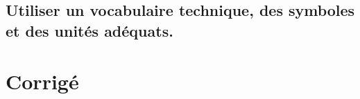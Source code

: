 \documentclass[10pt,fleqn]{article}
\newcommand{\repRel}{../..}
\newcommand{\repStyle}{\repRel/Style}
\newcommand{\td}{fichier_td}
\newcommand{\repExos}{\repRel/ExercicesCompetences}
\newcommand{\repExo}{dossier}
\begin{document}
\begin{multicols}{2}
\renewcommand{\repExo}{\repExos/E2_ProduireInformation/E2_05_Dessin2D/1011_Dessin2D}
\renewcommand{\td}{1011_Dessin2D}
\graphicspath{{\repStyle/png/}{\repExo/images/}}


\renewcommand{\repExo}{\repExos/E2_ProduireInformation/E2_05_Dessin2D/1012_Dessin2D}
\renewcommand{\td}{1012_Dessin2D}
\graphicspath{{\repStyle/png/}{\repExo/images/}}


\renewcommand{\repExo}{\repExos/E2_ProduireInformation/E2_05_Dessin2D/1013_Dessin2D}
\renewcommand{\td}{1013_Dessin2D}
\graphicspath{{\repStyle/png/}{\repExo/images/}}


\renewcommand{\repExo}{\repExos/E2_ProduireInformation/E2_05_Dessin2D/1014_Dessin2D}
\renewcommand{\td}{1014_Dessin2D}
\graphicspath{{\repStyle/png/}{\repExo/images/}}


\renewcommand{\repExo}{\repExos/E2_ProduireInformation/E2_05_Dessin2D/1015_Dessin2D}
\renewcommand{\td}{1015_Dessin2D}
\graphicspath{{\repStyle/png/}{\repExo/images/}}


\renewcommand{\repExo}{\repExos/E2_ProduireInformation/E2_05_Dessin2D/1016_Dessin2D}
\renewcommand{\td}{1016_Dessin2D}
\graphicspath{{\repStyle/png/}{\repExo/images/}}


\renewcommand{\repExo}{\repExos/E2_ProduireInformation/E2_05_Dessin2D/1017_Dessin2D}
\renewcommand{\td}{1017_Dessin2D}
\graphicspath{{\repStyle/png/}{\repExo/images/}}


\renewcommand{\repExo}{\repExos/E2_ProduireInformation/E2_05_Dessin2D/1020_PompeEnsieta}
\renewcommand{\td}{1020_PompeEnsieta}
\graphicspath{{\repStyle/png/}{\repExo/images/}}


\end{multicols}

\subsection{Utiliser un vocabulaire technique, des symboles et des unités adéquats.} 

\begin{multicols}{2} 

\end{multicols}

\proftrue
\setcounter{numexo}{0}

\section{Corrigé} 
\end{document}
